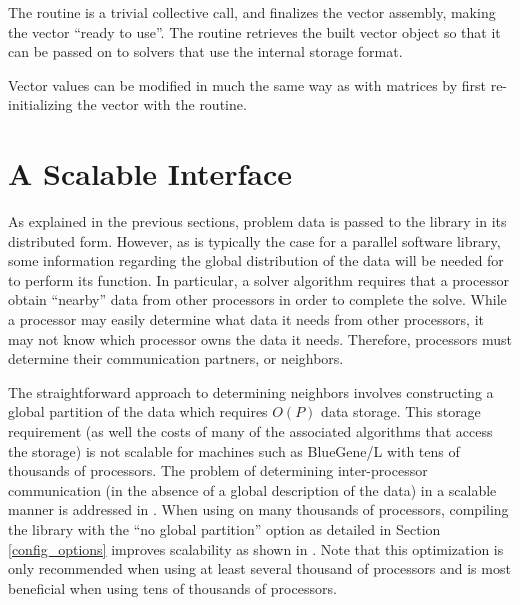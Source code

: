 The  routine is a trivial collective call, and
finalizes the vector assembly, making the vector ``ready to use''.
The  routine retrieves the built vector object so
that it can be passed on to \hypre{} solvers that use the
 internal storage format.

Vector values can be modified in much the same way as with matrices by
first re-initializing the vector with the  routine.



\section{A Scalable Interface}

As explained in the previous sections, problem data is passed to the
\hypre{} library in its distributed form.  However, as is typically
the case for a parallel software library, some information
regarding the global distribution of the data will be needed for
\hypre{} to perform its function.
In particular, a solver algorithm requires that a processor obtain
``nearby'' data from other processors in order to complete the solve.
While a processor may easily determine what data it needs from other
processors, it may not know which processor owns the data it needs.
Therefore, processors must determine their communication partners, or
neighbors.

The straightforward approach to determining neighbors involves
constructing a global partition of the data which requires $O(P)$ data
storage. This storage requirement (as well the costs of many of the
associated algorithms that access the storage) is not scalable for
machines such as BlueGene/L with tens of thousands of processors. The
problem of determining inter-processor communication (in the absence
of a global description of the data) in a scalable manner is addressed
in \cite{assumedpartition06}. When using \hypre{} on many thousands of
processors, compiling the library with the ``no global partition''
option as detailed in Section \ref{config_options} improves
scalability as shown in
\cite{assumedpartition06}.  Note that this optimization is only
recommended when using at least several thousand of processors and is
most beneficial when using tens of thousands of processors.

